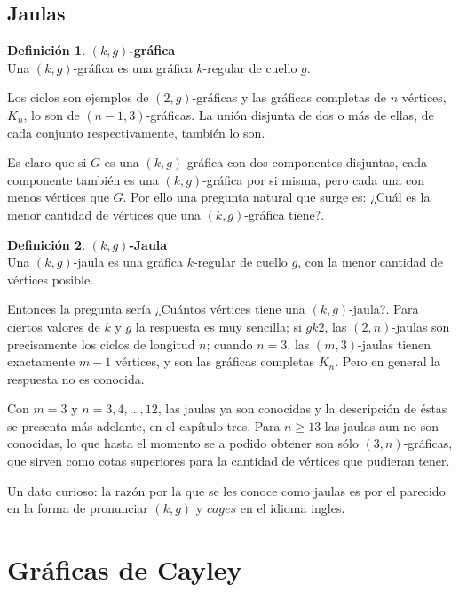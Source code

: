 \documentclass[11pt]{book}
\theoremstyle{definition}
\newtheorem{definition}{Definición}
\begin{document}
\subsection{Jaulas}

\begin{definition}\textbf{$(k,g)$-gráfica}\\
  Una $(k,g)$-gráfica es una gráfica $k$-regular de cuello $g$.
\end{definition}

Los ciclos son ejemplos de $(2,g)$-gráficas y las gráficas completas de $n$ vértices, $K_n$,
lo son de $(n-1,3)$-gráficas. La unión disjunta de dos o más de
ellas, de cada conjunto respectivamente, también lo son.

Es claro que si $G$ es una $(k,g)$-gráfica con dos componentes
disjuntas, cada componente también es una $(k,g)$-gráfica por si
misma, pero cada una con menos vértices que $G$. Por ello una pregunta
natural que surge es: ¿Cuál es la menor cantidad de vértices que una
$(k,g)$-gráfica tiene?.

\begin{definition}\textbf{$(k,g)$-Jaula}\\
  Una $(k,g)$-jaula es una gráfica $k$-regular de cuello $g$, con la
  menor cantidad de vértices posible.
\end{definition}

Entonces la pregunta sería ¿Cuántos vértices tiene una
$(k,g)$-jaula?. Para ciertos valores de $k$ y $g$ la respuesta es muy
sencilla; si $gk2$, las $(2,n)$-jaulas son precisamente los ciclos de
longitud $n$; cuando $n=3$, las $(m,3)$-jaulas tienen exactamente
$m-1$ vértices, y son las gráficas completas $K_n$. Pero en general la respuesta no es conocida.

Con $m=3$ y $n=3,4,...,12$, las jaulas ya son conocidas y la
descripción de éstas se presenta más adelante, en el capítulo tres. Para
$n\geq 13$ las jaulas aun no son conocidas, lo que hasta el momento se a podido obtener son sólo
$(3,n)$-gráficas, que sirven como cotas superiores para la cantidad de
vértices que pudieran tener.

Un dato curioso: la razón por la que se les conoce como jaulas es por
el parecido en la forma de pronunciar $(k,g)$ y $cages$ en el idioma
ingles.
 


\section{Gráficas de Cayley}
\end{document}
